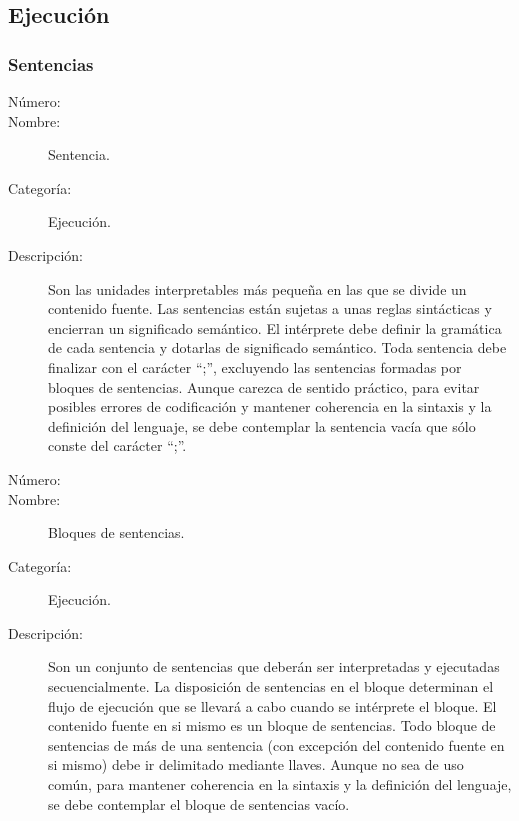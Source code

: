 \subsection{Ejecución}
\subsubsection{Sentencias}
	\begin{description}
		\item [Número:] \cn
		\item [Nombre:] Sentencia.
		\item [Categoría:] Ejecución.
		\item [Descripción:] Son las unidades interpretables más pequeña en las que se divide un contenido fuente. Las sentencias están sujetas a
		unas reglas sintácticas y encierran un significado semántico. El intérprete debe definir la gramática de cada sentencia y dotarlas de significado
		semántico. Toda sentencia debe finalizar con el carácter ``;'', excluyendo las sentencias formadas por bloques de sentencias. Aunque carezca
		de sentido práctico, para evitar posibles errores de codificación y mantener coherencia en la sintaxis y la definición del lenguaje, se debe
		contemplar la sentencia vacía que sólo conste del carácter ``;''.
	\end {description}

	\begin{description}
		\item [Número:] \cn
		\item [Nombre:] Bloques de sentencias.
		\item [Categoría:] Ejecución.
		\item [Descripción:] Son un conjunto de sentencias que deberán ser interpretadas y ejecutadas secuencialmente. La disposición de
		sentencias en el bloque determinan el flujo de ejecución que se llevará a cabo cuando se intérprete el bloque. El contenido fuente
		en si mismo es un bloque de sentencias. Todo bloque de sentencias de más de una sentencia (con excepción del contenido fuente en si mismo)
		debe ir delimitado mediante llaves. Aunque no sea de uso común, para mantener coherencia en la sintaxis y la definición del lenguaje, se debe
		contemplar el bloque de sentencias vacío.
	\end {description}

